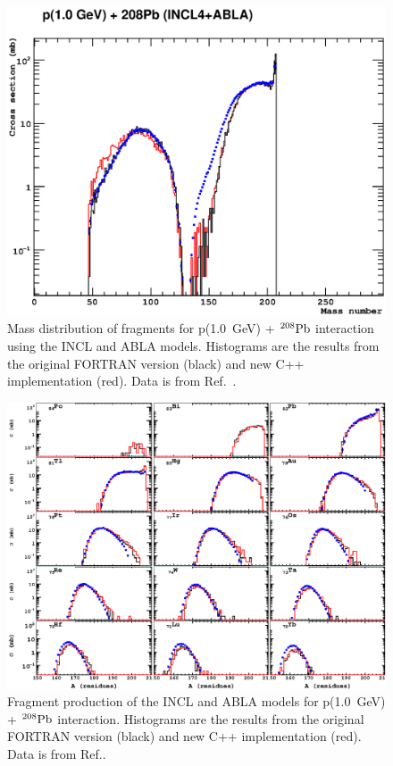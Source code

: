 \documentclass[a4paper]{jpconf}
\begin{document}
\begin{figure}[h]
\begin{center}
\includegraphics[scale=0.80]{images/proton1000MeVPb.eps}

\caption{\label{fig:fragpb}Mass distribution of fragments  for p(1.0~GeV) + $^{208}{\rm Pb}$ interaction 
using the INCL and ABLA  models.
Histograms are the results from the original FORTRAN version (black) 
and new C++ implementation (red). Data is from Ref.~\cite{gsifragments}.}
\end{center}
\end{figure}

\begin{figure}[h]
\begin{center}
\includegraphics[scale=0.80]{poster/images/pPbIsotopes.eps}

\caption{\label{fig:fragisotopes}Fragment production of the INCL and ABLA  models 
for p(1.0~GeV) + $^{208}{\rm Pb}$ interaction. %
Histograms are the results from the original FORTRAN version (black)
and new C++ implementation (red). Data is from Ref.\cite{gsifragments}.}

\end{center}
\end{figure}
\end{document}
